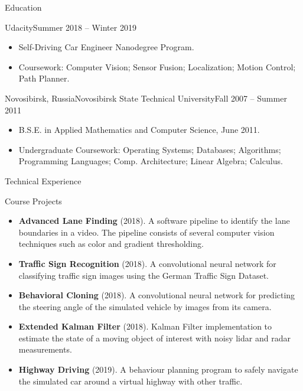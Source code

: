 \documentclass[]{cv}
\begin{document}
	\begin{cvsection}{Education}
    \begin{cvsubsection}{Udacity}{}{Summer 2018 -- Winter 2019}
			\begin{itemize}
				\item Self-Driving Car Engineer Nanodegree Program.
				\item Coursework: Computer Vision; Sensor Fusion; Localization; Motion Control; Path Planner.
			\end{itemize}
		\end{cvsubsection}
		\begin{cvsubsection}{Novosibirsk, Russia}{Novosibirsk State Technical University}{Fall 2007 -- Summer 2011}
			\begin{itemize}
				\item B.S.E. in Applied Mathematics and Computer Science, June 2011.
				\item Undergraduate Coursework: Operating Systems; Databases; Algorithms; Programming Languages; Comp. Architecture; Linear Algebra; Calculus.
			\end{itemize}
		\end{cvsubsection}
	\end{cvsection}

	\begin{cvsection}{Technical Experience}
		\begin{cvsubsection}{Course Projects}{}{}
			\begin{itemize}
				\item \textbf{Advanced Lane Finding} (2018). A software pipeline to identify the lane boundaries in a video. The pipeline consists of several computer vision techniques such as color and gradient thresholding.
				\item \textbf{Traffic Sign Recognition} (2018). A convolutional neural network for classifying traffic sign images using the German Traffic Sign Dataset.
				\item \textbf{Behavioral Cloning} (2018). A convolutional neural network for predicting the steering angle of the simulated vehicle by images from its camera.
				\item \textbf{Extended Kalman Filter} (2018). Kalman Filter implementation to estimate the state of a moving object of interest with noisy lidar and radar measurements.
				\item \textbf{Highway Driving} (2019). A behaviour planning program to safely navigate the simulated car around a virtual highway with other traffic.
			\end{itemize}
		\end{cvsubsection}
	\end{cvsection}
\end{document}
